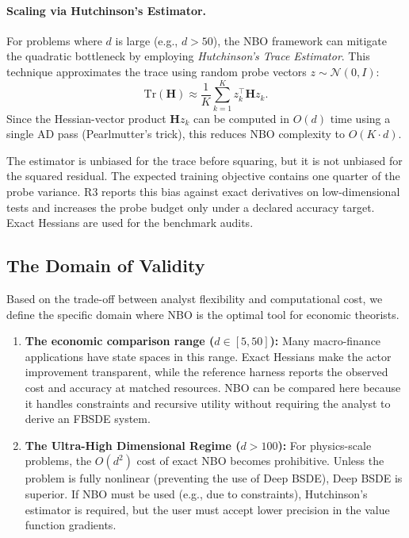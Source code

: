 \documentclass[ecta]{econsocart}
\theoremstyle{plain}
\theoremstyle{remark}
\begin{document}
\paragraph*{Scaling via Hutchinson's Estimator.}
For problems where $d$ is large (e.g., $d > 50$), the NBO framework can mitigate the quadratic bottleneck by employing \textit{Hutchinson's Trace Estimator}. This technique approximates the trace using random probe vectors $z \sim \mathcal{N}(0, I)$:
\begin{equation}
    \text{Tr}(\bm{H}) \approx \frac{1}{K} \sum_{k=1}^K z_k^\top \bm{H} z_k.
\end{equation}
Since the Hessian-vector product $\bm{H} z_k$ can be computed in $O(d)$ time using a single AD pass (Pearlmutter's trick), this reduces NBO complexity to $O(K \cdot d)$.

The estimator is unbiased for the trace before squaring, but it is not unbiased for the squared residual. The expected training objective contains one quarter of the probe variance. R3 reports this bias against exact derivatives on low-dimensional tests and increases the probe budget only under a declared accuracy target. Exact Hessians are used for the benchmark audits.

\subsection{The Domain of Validity}
\label{sec:domain_of_validity}

Based on the trade-off between analyst flexibility and computational cost, we define the specific domain where NBO is the optimal tool for economic theorists.

\begin{enumerate}
    \item \textbf{The economic comparison range ($d \in [5, 50]$):} Many macro-finance applications have state spaces in this range. Exact Hessians make the actor improvement transparent, while the reference harness reports the observed cost and accuracy at matched resources. NBO can be compared here because it handles constraints and recursive utility without requiring the analyst to derive an FBSDE system.

    \item \textbf{The Ultra-High Dimensional Regime ($d > 100$):} For physics-scale problems, the $O(d^2)$ cost of exact NBO becomes prohibitive. Unless the problem is fully nonlinear (preventing the use of Deep BSDE), Deep BSDE is superior. If NBO must be used (e.g., due to constraints), Hutchinson's estimator is required, but the user must accept lower precision in the value function gradients.
\end{enumerate}
\end{document}
